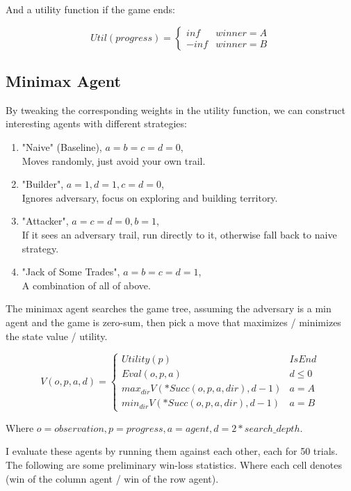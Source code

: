 \documentclass[10pt]{article}
\begin{document}
And a utility function if the game ends:

\[
    Util(progress) = 
    \begin{cases}
        inf & winner = A \\
        -inf & winner= B
    \end{cases} 
\]

\subsection{Minimax Agent}

By tweaking the corresponding weights in the utility function, we can construct interesting agents with different strategies:

\begin{enumerate}
    \item "Naive" (Baseline), $a=b=c=d=0$, \\
    Moves randomly, just avoid your own trail.
    \item "Builder", $a=1, d=1, c=d=0$, \\
    Ignores adversary, focus on exploring and building territory.
    \item "Attacker", $a=c=d=0, b=1$, \\
    If it sees an adversary trail, run directly to it, otherwise fall back to naive strategy.
    \item "Jack of Some Trades", $a=b=c=d=1$,\\
    A combination of all of above.
\end{enumerate}


The minimax agent searches the game tree, assuming the adversary is a min agent and the game is zero-sum, then pick a move that maximizes / minimizes the state value / utility.

\[
    V(o, p, a, d) = 
    \begin{cases}
        Utility(p) & IsEnd \\
        Eval(o,p,a) & d \leq 0 \\
        max_{dir} V(*Succ(o,p,a,dir), d-1) & a = A\\
        min_{dir} V(*Succ(o,p,a,dir), d-1) & a = B\
    \end{cases} 
\]

Where $o=observation, p=progress, a=agent, d = 2 * search\_depth$.

I evaluate these agents by running them against each other, each for 50 trials. The following are some preliminary win-loss statistics. Where each cell denotes (win of the column agent / win of the row agent).
\end{document}
